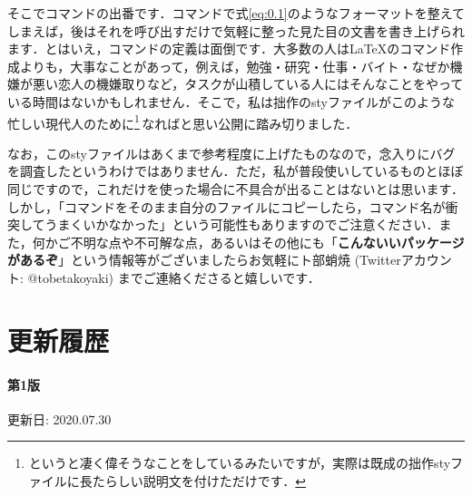 \documentclass[uplatex]{jsreport}
\begin{document}
そこでコマンドの出番です．コマンドで式\eqref{eq:0.1}のようなフォーマットを整えてしまえば，後はそれを呼び出すだけで気軽に整った見た目の文書を書き上げられます．とはいえ，コマンドの定義は面倒です．大多数の人は{\LaTeX}のコマンド作成よりも，大事なことがあって，例えば，勉強・研究・仕事・バイト・なぜか機嫌が悪い恋人の機嫌取りなど，タスクが山積している人にはそんなことをやっている時間はないかもしれません．そこで，私は拙作のstyファイルがこのような忙しい現代人のために\footnote{というと凄く偉そうなことをしているみたいですが，実際は既成の拙作styファイルに長たらしい説明文を付けただけです．}\,なればと思い公開に踏み切りました．
\par
\sukima
なお，このstyファイルはあくまで参考程度に上げたものなので，念入りにバグを調査したというわけではありません．ただ，私が普段使いしているものとほぼ同じですので，これだけを使った場合に不具合が出ることはないとは思います．しかし，「コマンドをそのまま自分のファイルにコピーしたら，コマンド名が衝突してうまくいかなかった」という可能性もありますのでご注意ください．また，何かご不明な点や不可解な点，あるいはその他にも「\textbf{こんないいパッケージがあるぞ}」という情報等がございましたらお気軽にト部蛸焼 (Twitterアカウント: @tobetakoyaki) までご連絡くださると嬉しいです．
\par
\tableofcontents
\newpage
\section*{更新履歴}
\paragraph{第1版} 更新日: 2020.07.30\par
\end{document}

